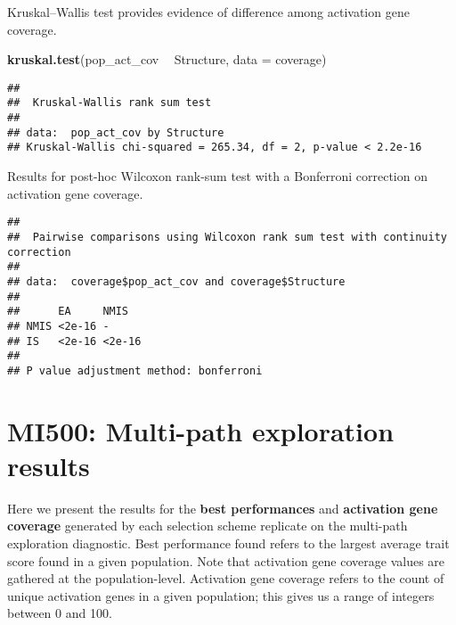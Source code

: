 \documentclass[]{book}
\newenvironment{Shaded}{\begin{snugshade}}{\end{snugshade}}
\newcommand{\DataTypeTok}[1]{\textcolor[rgb]{0.13,0.29,0.53}{#1}}
\newcommand{\KeywordTok}[1]{\textcolor[rgb]{0.13,0.29,0.53}{\textbf{#1}}}
\newcommand{\NormalTok}[1]{#1}
\newcommand{\OperatorTok}[1]{\textcolor[rgb]{0.81,0.36,0.00}{\textbf{#1}}}
\newcommand{\OtherTok}[1]{\textcolor[rgb]{0.56,0.35,0.01}{#1}}
\newcommand{\StringTok}[1]{\textcolor[rgb]{0.31,0.60,0.02}{#1}}
\begin{document}
Kruskal--Wallis test provides evidence of difference among activation gene coverage.

\begin{Shaded}
\begin{Highlighting}[]
\KeywordTok{kruskal.test}\NormalTok{(pop_act_cov }\OperatorTok{~}\StringTok{ }\NormalTok{Structure, }\DataTypeTok{data =}\NormalTok{ coverage)}
\end{Highlighting}
\end{Shaded}

\begin{verbatim}
## 
##  Kruskal-Wallis rank sum test
## 
## data:  pop_act_cov by Structure
## Kruskal-Wallis chi-squared = 265.34, df = 2, p-value < 2.2e-16
\end{verbatim}

Results for post-hoc Wilcoxon rank-sum test with a Bonferroni correction on activation gene coverage.

\begin{Shaded}
\end{Shaded}

\begin{verbatim}
## 
##  Pairwise comparisons using Wilcoxon rank sum test with continuity correction 
## 
## data:  coverage$pop_act_cov and coverage$Structure 
## 
##      EA     NMIS  
## NMIS <2e-16 -     
## IS   <2e-16 <2e-16
## 
## P value adjustment method: bonferroni
\end{verbatim}

\hypertarget{mi500-multi-path-exploration-results}{%
\chapter{MI500: Multi-path exploration results}\label{mi500-multi-path-exploration-results}}

Here we present the results for the \textbf{best performances} and \textbf{activation gene coverage} generated by each selection scheme replicate on the multi-path exploration diagnostic.
Best performance found refers to the largest average trait score found in a given population.
Note that activation gene coverage values are gathered at the population-level.
Activation gene coverage refers to the count of unique activation genes in a given population; this gives us a range of integers between 0 and 100.
\end{document}
